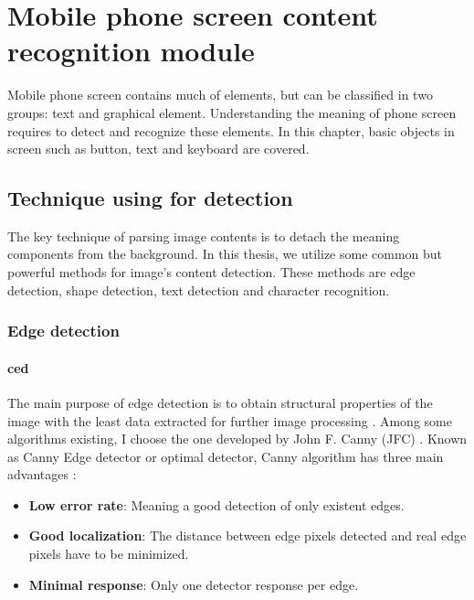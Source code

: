\chapter{Mobile phone screen content recognition module}
\label{ch:screen_recognize}
Mobile phone screen contains much of elements, but can be classified in two groups: text and graphical element.
Understanding the meaning of phone screen requires to detect and recognize these elements.
In this chapter, basic objects in screen such as button, text and keyboard are covered.

\section{Technique using for detection}
The key technique of parsing image contents is to detach the meaning components from the background. In this thesis, we utilize some common but powerful methods for image's content detection. These methods are edge detection, shape detection, text detection and character recognition.

\subsection{Edge detection}
\subsubsection{\acrfull{ced}}
The main purpose of edge detection is to obtain structural properties of the image with the least data extracted for further image processing \cite{canny}. Among some algorithms existing, I choose the one developed by John F. Canny (JFC) \nocite{jfc_canny}. Known as Canny Edge detector or optimal detector, Canny algorithm has three main advantages \cite{code_canny}:
	\begin{itemize}
		\item \textbf{Low error rate}: Meaning a good detection of only existent edges.
		\item \textbf{Good localization}: The distance between edge pixels detected and real edge pixels have to be minimized.
		\item \textbf{Minimal response}: Only one detector response per edge.
	\end{itemize}

